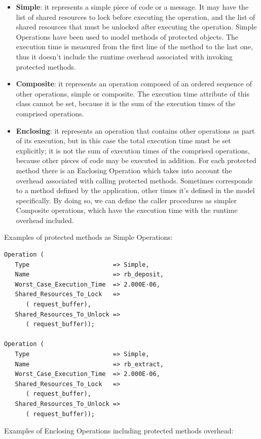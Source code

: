 \documentclass{article}
\begin{document}
\begin{itemize}
   \item \textbf{Simple}: it represents a simple piece of code or a message. It may have the list of shared resources to lock before executing the operation, and the list of shared resources that must be unlocked after executing the operation. Simple Operations have been used to model methods of protected objects. The execution time is measured from the first line of the method to the last one, thus it doesn't include the runtime overhead associated with invoking protected methods.
   \item \textbf{Composite}: it represents an operation composed of an ordered sequence of other operations, simple or composite. The execution time attribute of this class cannot be set, because it is the sum of the execution times of the comprised operations.
   \item \textbf{Enclosing}: it represents an operation that contains other operations as part of its execution, but in this case the total execution time must be set explicitly; it is not the sum of execution times of the comprised operations, because other pieces of code may be executed in addition. For each protected method there is an Enclosing Operation which takes into account the overhead associated with calling protected methods. Sometimes corresponds to a method defined by the application, other times it's defined in the model specifically. By doing so, we can define the caller procedures as simpler Composite operations, which have the execution time with the runtime overhead included.
\end{itemize}

Examples of protected methods as Simple Operations:

\begin{lstlisting}
Operation (
   Type                       => Simple,
   Name                       => rb_deposit,
   Worst_Case_Execution_Time  => 2.000E-06,
   Shared_Resources_To_Lock   =>
      ( request_buffer),
   Shared_Resources_To_Unlock =>
      ( request_buffer));

Operation (
   Type                       => Simple,
   Name                       => rb_extract,
   Worst_Case_Execution_Time  => 2.000E-06,
   Shared_Resources_To_Lock   =>
      ( request_buffer),
   Shared_Resources_To_Unlock =>
      ( request_buffer));
\end{lstlisting}

Examples of Enclosing Operations including protected methods overhead:
\end{document}
